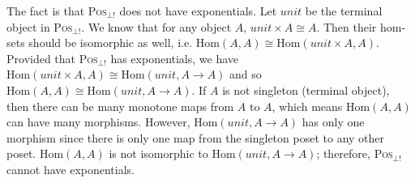 \begin{myitemize}
The fact is that \textsc{Pos}$_{\bot !}$ does not have exponentials. Let $ unit $ be the terminal object in \textsc{Pos}$_{\bot !}$. We know that for any object $ A $, $ unit \times A \cong A $. Then their hom-sets should be isomorphic as well, i.e. $ \text{Hom}(A,A) \cong \text{Hom}(unit \times A,A) $. Provided that \textsc{Pos}$_{\bot !}$ has exponentials, we have $ \text{Hom}(unit \times A,A) \cong \text{Hom}(unit, A \to A) $ and so $ \text{Hom}(A,A) \cong \text{Hom}(unit, A \to A) $. If $ A $ is not singleton (terminal object), then there can be many monotone maps from $ A $ to $ A $, which means $ \text{Hom}(A,A) $ can have many morphisms. However, $ \text{Hom}(unit, A \to A) $ has only one morphism since there is only one map from the singleton poset to any other poset. $ \text{Hom}(A,A) $ is not isomorphic to  $ \text{Hom}(unit, A \to A) $; therefore, \textsc{Pos}$_{\bot !}$ cannot have exponentials.

\end{myitemize}